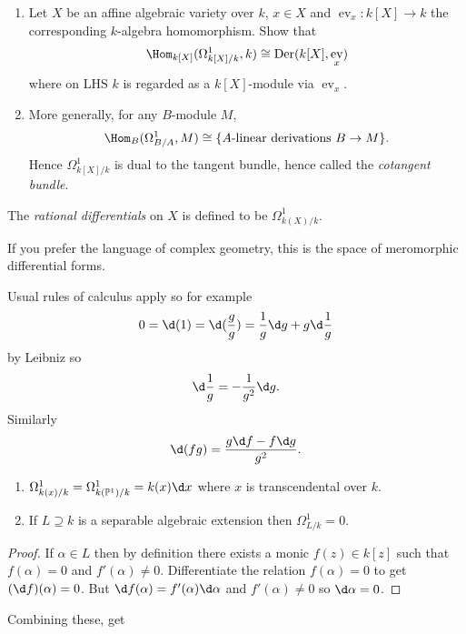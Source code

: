 \documentclass[a4paper]{article}
\DeclareMathOperator{\ev}{ev}
\renewcommand*{\P}{\mathbb{P}}
\DeclareMathOperator{\Der}{Der} %
\begin{document}
\begin{ex}\leavevmode
  \begin{enumerate}
  \item Let \(X\) be an affine algebraic variety over \(k\), \(x \in X\) and \(\ev_x: k[X] \to k\) the corresponding \(k\)-algebra homomorphism. Show that
    \[
      \Hom_{k[X]} (\Omega^1_{k[X]/k}, k) \cong \Der(k[X], \ev_x)
    \]
    where on LHS \(k\) is regarded as a \(k[X]\)-module via \(\ev_x\).
  \item More generally, for any \(B\)-module \(M\),
    \[
      \Hom_B(\Omega^1_{B/A}, M) \cong \{A\text{-linear derivations } B \to M\}.
    \]
    Hence \(\Omega^1_{k[X]/k}\) is dual to the tangent bundle, hence called the \emph{cotangent bundle}.
  \end{enumerate}
\end{ex}

\begin{definition}
  The \emph{rational differentials} on \(X\) is defined to be \(\Omega^1_{k(X)/k}\).
\end{definition}
If you prefer the language of complex geometry, this is the space of meromorphic differential forms.

Usual rules of calculus apply so for example
\[
  0 = \d (1) = \d (\frac{g}{g}) = \frac{1}{g} \d g + g \d \frac{1}{g}
\]
by Leibniz so
\[
  \d \frac{1}{g} = -\frac{1}{g^2} \d g.
\]
Similarly
\[
  \d(fg) = \frac{g \d f - f \d g}{g^2}.
\]

\begin{corollary}\leavevmode
  \begin{enumerate}
  \item \(\Omega^1_{k(x)/k} = \Omega^1_{k(\P^1)/k} = k(x) \d x\) where \(x\) is transcendental over \(k\).
  \item If \(L \supseteq k\) is a separable algebraic extension then \(\Omega^1_{L/k} = 0\).
  \end{enumerate}
\end{corollary}

\begin{proof}
  If \(\alpha \in L\) then by definition there exists a monic \(f(z) \in k[z]\) such that \(f(\alpha) = 0\) and \(f'(\alpha) \neq 0\). Differentiate the relation \(f(\alpha) = 0\) to get \((\d f)(\alpha) = 0\). But \(\d f(\alpha) = f'(\alpha) \d \alpha\) and \(f'(\alpha) \neq 0\) so \(\d \alpha = 0\).
\end{proof}

Combining these, get
\end{document}
